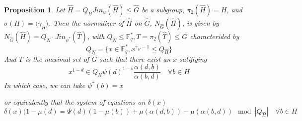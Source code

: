 \documentclass{article}
\newtheorem{proposition}[theorem]{Proposition}
\begin{document}
\begin{proposition}
    Let $\hat{H}=Q_{\hat{H}} Jin_{\psi}(\hat{H})\leq \hat{G}$ be a subgroup, $\pi_2(\hat{H}) =H$, and  $\sigma(H) = \langle \gamma_H\rangle$. Then the normalizer of $\hat{H}$ on $\hat{G}$, $N_{\hat{G}}(\hat{H})$, is given by $N_{\hat{G}}(\hat{H})=Q_N \cdot Jin_{\psi^*}(\hat{T})$, with $Q_N\leq \mathbb{F}_q^*, T=\pi_2(\hat{T}) \leq G$ characterided by
    \begin{equation}
        Q_N = \{x \in  \mathbb{F}_q^*,x^{\gamma_H-1} \leq Q_{\hat{H}} \}
    \end{equation}
    And $T$ is the maximal set of $\hat{G}$ such that there exist an $x$ satifiying 
    \begin{equation}
        x^{1-d}  \in Q_{H} \psi(d)^{1-b} \frac{\alpha(d,b)}{\alpha(b,d)}\quad \forall b \in H
    \end{equation}
    In which case, we can take $\psi^*(b)=x$ 

    or equivalently that the system of equations on $\delta(x)$
    \begin{equation}
        \delta(x)(1-\mu(d) = \Psi(d)(1-\mu(b)) + \mu(\alpha(d,b)) - \mu(\alpha(b,d)) \mod |Q_{\hat{H}}| \quad \forall b \in H
    \end{equation}
\end{proposition}
\end{document}
